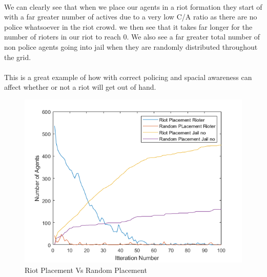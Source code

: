 \documentclass[11pt]{article}
\begin{document}
	\\
	We can clearly see that when we place our agents in a riot formation they start of with a far greater number of actives due to a very low C/A ratio as there are no police whatsoever in the riot crowd. we then see that it takes far longer for the number of rioters in our riot to reach 0. We also see a far greater total number of non police agents going into jail when they are randomly distributed throughout the grid.\\
	\\
	This is a great example of how with correct policing and spacial awareness can affect whether or not a riot will get out of hand.
	
	\begin{figure}[H]
		\includegraphics[width=\linewidth]{Riot Placement vs Random Placement.png}
		\caption{Riot Placement Vs Random Placement}
		\label{fig:frenchriot}
	\end{figure}
	
\end{document}
